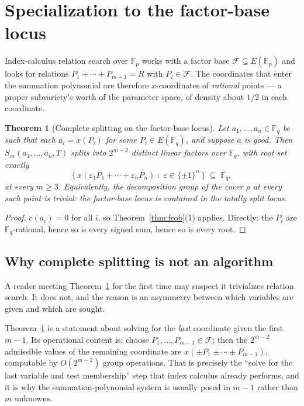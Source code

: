 \documentclass[11pt,a4paper]{article}
\theoremstyle{plain}
\newtheorem{theorem}{Theorem}[section]
\theoremstyle{definition}
\newcommand{\FF}{\mathbb{F}}
\newcommand{\Fq}{\FF_q}
\newcommand{\eps}{\varepsilon}
\begin{document}
\section{Specialization to the factor-base locus}\label{sec:factorbase}

Index-calculus relation search over $\FF_p$ works with a factor base
$\mathcal{F} \subseteq E(\FF_p)$ and looks for relations
$P_1 + \cdots + P_{m-1} = R$ with $P_i \in \mathcal{F}$. The coordinates that
enter the summation polynomial are therefore $x$-coordinates of \emph{rational}
points --- a proper subvariety's worth of the parameter space, of density about
$1/2$ in each coordinate.

\begin{theorem}[Complete splitting on the factor-base locus]\label{thm:factorbase}
Let $a_1,\dots,a_n \in \Fq$ be such that each $a_i = x(P_i)$ for some
$P_i \in E(\Fq)$, and suppose $a$ is good. Then $S_m(a_1,\dots,a_n,T)$ splits into
$2^{m-2}$ distinct linear factors over $\Fq$, with root set exactly
\[
  \bigl\{\, x(\eps_1 P_1 + \cdots + \eps_n P_n) \;:\; \eps \in \{\pm1\}^n \,\bigr\}
  \;\subseteq\; \Fq,
\]
at every $m \ge 3$. Equivalently, the decomposition group of the cover
$\rho$ at every such point is trivial: the factor-base locus is contained in the
totally split locus.
\end{theorem}

\begin{proof}
$c(a_i) = 0$ for all $i$, so Theorem~\ref{thm:frob}(1) applies. Directly: the
$P_i$ are $\Fq$-rational, hence so is every signed sum, hence so is every root.
\end{proof}

\subsection{Why complete splitting is not an algorithm}\label{sec:notalgo}

A reader meeting Theorem~\ref{thm:factorbase} for the first time may suspect it
trivializes relation search. It does not, and the reason is an asymmetry between
which variables are given and which are sought.

Theorem~\ref{thm:factorbase} is a statement about solving for the \emph{last}
coordinate given the first $m-1$. Its operational content is: choose
$P_1,\dots,P_{m-1} \in \mathcal{F}$; then the $2^{m-2}$ admissible values of the
remaining coordinate are $x(\pm P_1 \pm \cdots \pm P_{m-1})$, computable by
$O(2^{m-2})$ group operations. That is precisely the ``solve for the last
variable and test membership'' step that index calculus already performs, and it
is why the summation-polynomial system is usually posed in $m-1$ rather than $m$
unknowns.
\end{document}
